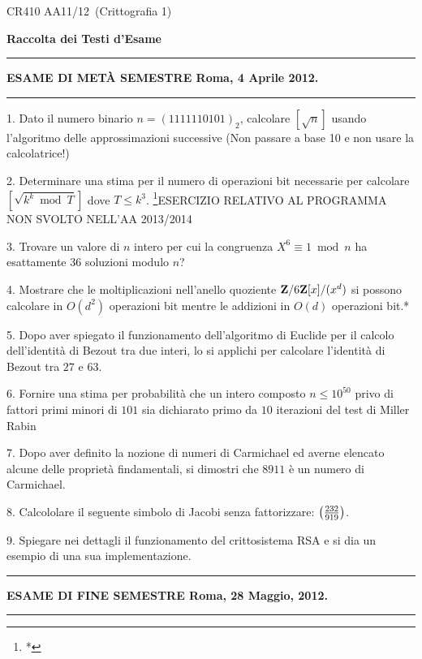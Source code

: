 \centerline{CR410 AA11/12\ (Crittografia 1)}\bigskip
\centerline{\bf Raccolta dei Testi d'Esame}
\bigskip

\smallskip\hrule\smallskip
\centerline{{\bf ESAME DI MET\`{A} SEMESTRE \hfill Roma, 4 Aprile 2012.}} \smallskip\hrule\smallskip

\item{1.} Dato il numero binario
$n=(1111110101)_2$, calcolare $[\sqrt{n}]$  usando l'algoritmo
delle approssimazioni successive (Non passare a base 10 e  non
usare la calcolatrice!)

\item{2.} Determinare una stima per il numero di operazioni bit necessarie per calcolare\hfill\break $[{\sqrt{k^k\bmod T}}]$ dove
$T\leq k^3$.  \footnote{*}{ESERCIZIO RELATIVO AL PROGRAMMA NON SVOLTO NELL'AA 2013/2014} 
\item{3.} Trovare un valore di $n$ intero per cui la congruenza $X^6\equiv 1\bmod n$ ha esattamente $36$ soluzioni modulo $n$?
\item{4.} Mostrare che le moltiplicazioni nell’anello quoziente ${\bf Z}/6{\bf Z}[x]/(x^d)$ si possono calcolare in $O(d^2)$ operazioni bit mentre le
addizioni in $O(d)$ operazioni bit.*
\item{5.} Dopo aver spiegato il funzionamento dell'algoritmo di Euclide per il calcolo dell'identi\-t\`a di Bezout
tra due interi, lo si applichi per calcolare l'identit\`a di Bezout tra $27$ e $63$.
\item{6.} Fornire una stima per probabilit\`{a} che un intero composto $n\leq 10^{50}$ privo di fattori primi minori di $101$ sia 
dichiarato primo da $10$ iterazioni del test di Miller Rabin
\item{7.} Dopo aver definito la nozione di numeri di Carmichael ed averne elencato alcune delle propriet\`a findamentali,
si dimostri che $8911$ \`e un numero di Carmichael.
\item{8.} Calcololare il seguente simbolo di Jacobi senza fattorizzare: $\left({232\over919}\right)$.
\item{9.} Spiegare nei dettagli il funzionamento del crittosistema RSA e si dia un esempio di una sua implementazione.
\bigskip

\smallskip\hrule\smallskip
\centerline{{\bf ESAME DI FINE SEMESTRE \hfill Roma, 28 Maggio, 2012.}}\smallskip\hrule\smallskip
 
